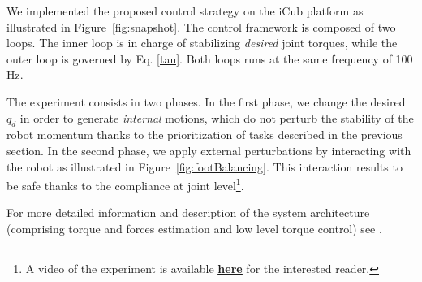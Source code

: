\documentclass[final,5p,twocolumn]{elsarticle}
\begin{document}

We implemented the proposed control strategy on the iCub platform as illustrated in Figure~\ref{fig:snapshot}. The control framework is composed of two
loops. The inner loop is in charge of stabilizing \emph{desired} joint torques, while the outer loop is governed by 
Eq. \eqref{tau}. Both loops runs at the same frequency of 100 Hz. 

The experiment consists in two phases. In the first phase, we change the desired $q_d$ in order to generate 
\emph{internal} motions, which do not perturb the stability of the robot momentum thanks to the prioritization of tasks
described in the previous section. In the second phase, we apply external perturbations by interacting with the robot as illustrated in Figure~\ref{fig:footBalancing}. This 
interaction  results to be safe thanks to the compliance at joint level\footnote{A video of the experiment is available \href{https://www.youtube.com/watch?v=VrPBSSQEr3A}{\textbf{\underline{here}}} for the interested reader.}.

For more detailed information and description of the system architecture (comprising torque and forces estimation and low level torque control) see \cite{noriFrontiers2015}.
\end{document}

